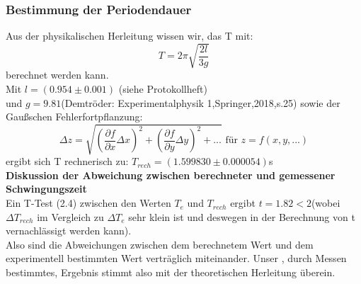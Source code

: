 \documentclass[11pt,a4paper]{article}
\begin{document}
	\subsubsection{Bestimmung der Periodendauer}
	Aus der physikalischen Herleitung wissen wir, das T mit:
	\begin{equation}
	T=2\pi \sqrt{\frac{2l}{3g}}
	\end{equation}
	berechnet werden kann.\\
	Mit $l=(0.954\pm 0.001)$ (siehe Protokollheft) \\ und $g=9.81$(Demtröder: Experimentalphysik 1,Springer,2018,s.25)
	sowie der Gaußschen Fehlerfortpflanzung:
	\begin{equation}
	\Delta z = \sqrt{(\frac{\partial f}{\partial x}\Delta x)^2 +(\frac {\partial f}{\partial y} \Delta y)^2+...} \text{   für   } z=f(x,y,...)
	\end{equation}
	ergibt sich T rechnerisch zu: $T_{rech}=(1.599830\pm0.000054)$s\\
	{\bf Diskussion der Abweichung zwischen berechneter und gemessener Schwingungszeit}\\
	Ein T-Test (2.4) zwischen den Werten $T_e$ und $T_{rech}$ ergibt $t=1.82<2$(wobei $\Delta T_{rech}$ im Vergleich zu $\Delta T_e$ sehr klein ist und deswegen in der Berechnung von t vernachlässigt werden kann).\\
	Also sind die Abweichungen zwischen dem berechnetem Wert und dem experimentell bestimmten Wert
	verträglich miteinander. Unser , durch Messen bestimmtes, Ergebnis stimmt also mit der theoretischen Herleitung überein.
\end{document}
